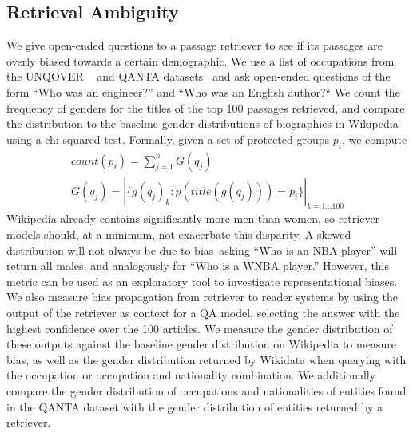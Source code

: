 \subsection{Retrieval Ambiguity}
We give open-ended questions to a passage retriever to see if its passages are overly biased towards a certain demographic.
We use a list of occupations from the UNQOVER  ~\citep{li2020unqovering} and QANTA datasets~\cite{rodriguez2019quizbowl} and ask open-ended questions of the form ``Who was an engineer?'' and ``Who was an English author?``
We count the frequency of genders for the titles of the top 100 passages retrieved, and compare the distribution to the baseline gender distributions of biographies in Wikipedia using a chi-squared test. Formally, given a set of protected groups ${p_i}$, we compute
\begin{gather*}
count(p_i) = \sum_{j=1}^{n}{G(q_j)} \\
G(q_j) = |\{g(q_j)_k: p(title(g(q_j)))=p_i\}|_{k=1...100}
\end{gather*}
Wikipedia already contains significantly more men than women, so retriever models should, at a minimum, not exacerbate this disparity. 
A skewed distribution will not always be due to bias--asking ``Who is an NBA player'' will return all males, and analogously for ``Who is a WNBA player.''
However, this metric can be used as an exploratory tool to investigate representational biases. 
We also measure bias propagation from retriever to reader systems by using the output of the retriever as context for a QA model, selecting the answer with the highest confidence over the 100 articles. 
We measure the gender distribution of these outputs against the baseline gender distribution on Wikipedia to measure bias, as well as the gender distribution returned by Wikidata when querying with the occupation or occupation and nationality combination. 
We additionally compare the gender distribution of occupations and nationalities of entities found in the QANTA dataset \cite{iyyer-etal-2014-neural} with the gender distribution of entities returned by a retriever. 
